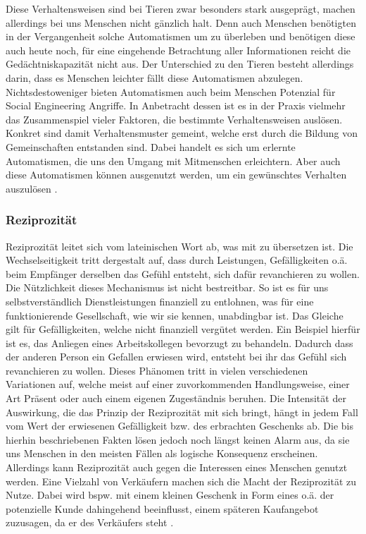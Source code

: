 Diese Verhaltensweisen sind bei Tieren zwar besonders stark ausgeprägt, machen allerdings bei uns Menschen nicht gänzlich halt.
Denn auch Menschen benötigten in der Vergangenheit solche Automatismen um zu überleben und benötigen diese auch heute noch, für eine eingehende Betrachtung aller Informationen reicht die Gedächtniskapazität nicht aus.
Der Unterschied zu den Tieren besteht allerdings darin, dass es Menschen leichter fällt diese Automatismen abzulegen.
Nichtsdestoweniger bieten Automatismen auch beim Menschen Potenzial für Social Engineering Angriffe.
In Anbetracht dessen ist es in der Praxis vielmehr das Zusammenspiel vieler Faktoren, die bestimmte Verhaltensweisen auslösen. Konkret sind damit Verhaltensmuster gemeint, welche erst durch die Bildung von Gemeinschaften entstanden sind. Dabei handelt es sich um erlernte Automatismen, die uns den Umgang mit Mitmenschen erleichtern. Aber auch diese Automatismen können ausgenutzt werden, um ein gewünschtes Verhalten auszulösen \citep{cialdini}.


\subsubsection{Reziprozität}\label{sec:reziprozität}
Reziprozität leitet sich vom lateinischen Wort  ab, was mit  zu übersetzen ist.
Die Wechselseitigkeit tritt dergestalt auf, dass durch Leistungen, Gefälligkeiten o.ä. beim Empfänger derselben das Gefühl entsteht, sich dafür revanchieren zu wollen.
Die Nützlichkeit dieses Mechanismus ist nicht bestreitbar.
So ist es für uns selbstverständlich Dienstleistungen finanziell zu entlohnen, was für eine funktionierende Gesellschaft, wie wir sie kennen, unabdingbar ist.
Das Gleiche gilt für Gefälligkeiten, welche nicht finanziell vergütet werden. Ein Beispiel hierfür ist es, das Anliegen eines Arbeitskollegen bevorzugt zu behandeln. Dadurch dass der anderen Person ein Gefallen erwiesen wird, entsteht bei ihr das Gefühl sich revanchieren zu wollen.
Dieses Phänomen tritt in vielen verschiedenen Variationen auf, welche meist auf einer zuvorkommenden Handlungsweise, einer Art Präsent oder auch einem eigenen Zugeständnis beruhen. Die Intensität der Auswirkung, die das Prinzip der Reziprozität mit sich bringt, hängt in jedem Fall vom Wert der erwiesenen Gefälligkeit bzw. des erbrachten Geschenks ab.
Die bis hierhin beschriebenen Fakten lösen jedoch noch längst keinen Alarm aus, da sie uns Menschen in den meisten Fällen als logische Konsequenz erscheinen.
Allerdings kann Reziprozität auch gegen die Interessen eines Menschen genutzt werden.
Eine Vielzahl von Verkäufern machen sich die Macht der Reziprozität zu Nutze.
Dabei wird bspw. mit einem kleinen Geschenk in Form eines  o.ä. der potenzielle Kunde dahingehend beeinflusst, einem späteren Kaufangebot zuzusagen, da er  des Verkäufers steht \citep{cialdini}.


